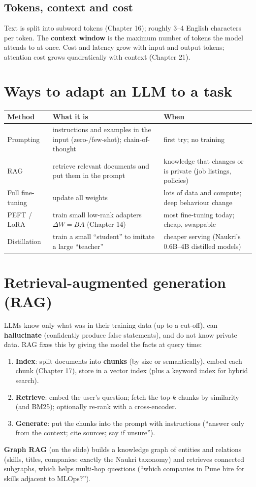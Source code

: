 \subsection{Tokens, context and cost}
Text is split into subword tokens (Chapter 16); roughly 3--4 English characters per token. The \textbf{context window} is the maximum number of tokens the model attends to
at once. Cost and latency grow with input and output tokens; attention cost grows quadratically with context (Chapter 21).

\section{Ways to adapt an LLM to a task}
\begin{center}\small
\begin{tabularx}{\linewidth}{l X X}
\toprule
Method & What it is & When\\
\midrule
Prompting & instructions and examples in the input (zero-/few-shot); chain-of-thought & first try; no training\\
RAG & retrieve relevant documents and put them in the prompt & knowledge that changes or is private (job listings, policies)\\
Full fine-tuning & update all weights & lots of data and compute; deep behaviour change\\
PEFT / LoRA & train small low-rank adapters $\Delta W = BA$ (Chapter 14) & most fine-tuning today; cheap, swappable\\
Distillation & train a small ``student'' to imitate a large ``teacher'' & cheaper serving (Naukri's 0.6B--4B distilled models)\\
\bottomrule
\end{tabularx}
\end{center}

\section{Retrieval-augmented generation (RAG)}
LLMs know only what was in their training data (up to a cut-off), can \textbf{hallucinate} (confidently produce false statements), and do not know private data. RAG fixes
this by giving the model the facts at query time:
\begin{enumerate}
\item \textbf{Index}: split documents into \textbf{chunks} (by size or semantically), embed each chunk (Chapter 17), store in a vector index (plus a keyword index for
  hybrid search).
\item \textbf{Retrieve}: embed the user's question; fetch the top-$k$ chunks by similarity (and BM25); optionally re-rank with a cross-encoder.
\item \textbf{Generate}: put the chunks into the prompt with instructions (``answer only from the context; cite sources; say if unsure'').
\end{enumerate}
\textbf{Graph RAG} (on the slide) builds a knowledge graph of entities and relations (skills, titles, companies: exactly the Naukri taxonomy) and retrieves connected
subgraphs, which helps multi-hop questions (``which companies in Pune hire for skills adjacent to MLOps?'').

